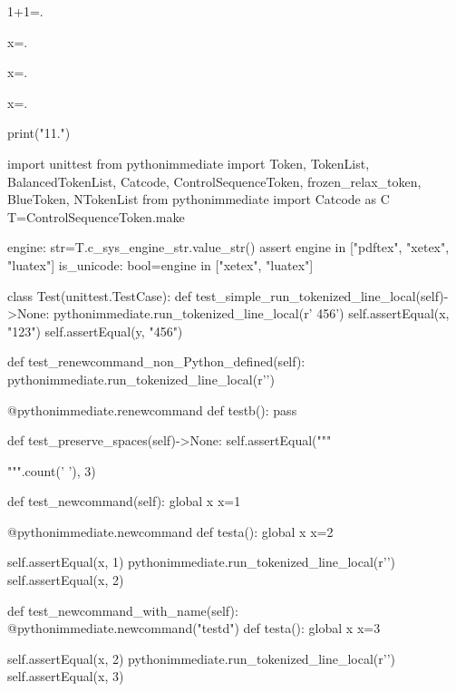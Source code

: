 \documentclass[a5paper]{article}
\begin{document}
1+1=.


x=.


x=.  %

x=.  %

\begin{pycode}
print("11.\n")
\end{pycode}

\begin{pycode}
\end{pycode}


\begin{pycode}


import unittest
from pythonimmediate import Token, TokenList, BalancedTokenList, Catcode, ControlSequenceToken, frozen_relax_token, BlueToken, NTokenList
from pythonimmediate import Catcode as C
T=ControlSequenceToken.make

engine: str=T.c_sys_engine_str.value_str()
assert engine in ["pdftex", "xetex", "luatex"]
is_unicode: bool=engine in ["xetex", "luatex"]

class Test(unittest.TestCase):
	def test_simple_run_tokenized_line_local(self)->None:
		pythonimmediate.run_tokenized_line_local(r' {456}')
		self.assertEqual(x, "123")
		self.assertEqual(y, "456")

	def test_renewcommand_non_Python_defined(self):
		pythonimmediate.run_tokenized_line_local(r'\def \testb {}')

		@pythonimmediate.renewcommand
		def testb(): pass


	def test_preserve_spaces(self)->None:
		self.assertEqual("""
   
""".count(' '), 3)

	def test_newcommand(self):
		global x
		x=1

		@pythonimmediate.newcommand
		def testa():
			global x
			x=2

		self.assertEqual(x, 1)
		pythonimmediate.run_tokenized_line_local(r'\testa')
		self.assertEqual(x, 2)

	def test_newcommand_with_name(self):
		@pythonimmediate.newcommand("testd")
		def testa():
			global x
			x=3

		self.assertEqual(x, 2)
		pythonimmediate.run_tokenized_line_local(r'\testd')
		self.assertEqual(x, 3)


\end{pycode}
\end{document}
